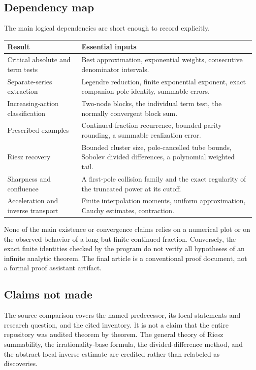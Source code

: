 \documentclass[11pt,a4paper]{article}
\numberwithin{equation}{section}
\theoremstyle{definition}
\theoremstyle{remark}
\begin{document}
\subsection{Dependency map}
The main logical dependencies are short enough to record explicitly.
\begin{center}\small
\begin{tabular}{>{\raggedright\arraybackslash}p{}>{\raggedright\arraybackslash}p{}}
\toprule
Result & Essential inputs\\
\midrule
Critical absolute and term tests & Best approximation, exponential
weights, consecutive denominator intervals.\\[3pt]
Separate-series extraction & Legendre reduction, finite exponential
exponent, exact companion-pole identity, summable errors.\\[3pt]
Increasing-action classification & Two-node blocks, the individual term
test, the normally convergent block sum.\\[3pt]
Prescribed examples & Continued-fraction recurrence, bounded parity
rounding, a summable realization error.\\[3pt]
Riesz recovery & Bounded cluster size, pole-cancelled tube bounds,
Sobolev divided differences, a polynomial weighted tail.\\[3pt]
Sharpness and confluence & A first-pole collision family and the exact
regularity of the truncated power at its cutoff.\\[3pt]
Acceleration and inverse transport & Finite interpolation moments,
uniform approximation, Cauchy estimates, contraction.\\
\bottomrule
\end{tabular}
\end{center}

None of the main existence or convergence claims relies on a numerical
plot or on the observed behavior of a long but finite continued
fraction. Conversely, the exact finite identities checked by the
program do not verify all hypotheses of an infinite analytic theorem.
The final article is a conventional proof document, not a formal proof
assistant artifact.

\subsection{Claims not made}
The source comparison covers the named predecessor, its local
statements and research question, and the cited inventory. It is not
a claim that the entire repository was audited theorem by theorem.
The general theory of Riesz summability, the irrationality-base
formula, the divided-difference method, and the abstract local inverse
estimate are credited rather than relabeled as discoveries.
\end{document}
